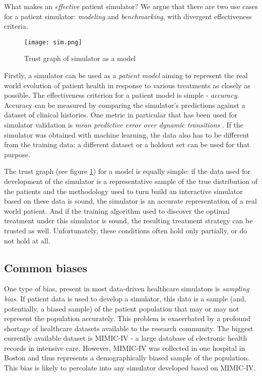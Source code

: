 What makes an \emph{effective} patient simulator?
We argue that there are two use cases for a patient simulator: {\sl modeling} and {\sl benchmarking}, with divergent effectiveness criteria.

\begin{figure}
    \centering
    \texttt{[image: sim.png]}
    \caption{Trust graph of simulator as a model}
    \label{fig:model}
\end{figure}

Firstly, a simulator can be used as a \emph{patient model} aiming to represent the real world evolution of patient health in response to various treatments as closely as possible.
The effectiveness criterion for a patient model is simple - \emph{accuracy}.
Accuracy can be measured by comparing the simulator's predictions against a dataset of clinical histories.
One metric in particular that has been used for simulator validation is \emph{mean predictive error over dynamic transitions} \cite{mdpe}.
If the simulator was obtained with machine learning, the data also has to be different from the training data: a different dataset or a holdout set can be used for that purpose.

The trust graph (see figure \ref{fig:model}) for a model is equally simple: if the data used for development of the simulator is a representative sample of the true distribution of the patients and the methodology used to turn build an interactive simulator based on these data is sound, the simulator is an accurate representation of a real world patient.
And if the training algorithm used to discover the optimal treatment under this simulator is sound, the resulting treatment strategy can be trusted as well.
Unfortunately, these conditions often hold only partially, or do not hold at all.

\subsection{Common biases}
\label{sec:bias}

One type of bias, present in most data-driven healthcare simulators is \emph{sampling bias}.
If patient data is used to develop a simulator, this data is a sample (and, potentially, a biased sample) of the patient population that may or may not represent the population accurately.
This problem is exacerbated by a profound shortage of healthcare datasets available to the research community.
The biggest currently available dataset is MIMIC-IV \cite{johnsonMIMICIVFreelyAccessible2023} - a large database of electronic health records in intensive care.
However, MIMIC-IV was collected in one hospital in Boston and thus represents a demographically biased sample of the population.
This bias is likely to percolate into any simulator developed based on MIMIC-IV.

